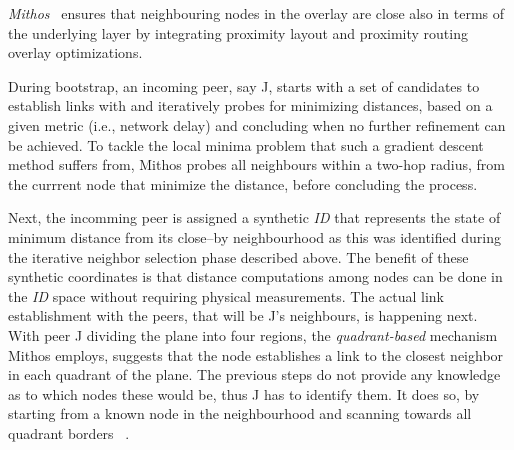 
\emph{Mithos}~\cite{WR2003} ensures that neighbouring nodes in the overlay are
close also in terms of the underlying layer by integrating proximity layout
and proximity routing overlay optimizations.

During bootstrap, an incoming peer, say J, starts with a set of
candidates to establish links with and iteratively
probes for minimizing distances, based on a given metric (i.e., network delay)
and concluding when no further refinement can be achieved. To tackle the local
minima problem that such a gradient descent method suffers from, Mithos probes
all neighbours within a two-hop radius, from the currrent node that minimize
the distance, before concluding the process.

Next, the incomming peer is assigned a synthetic \emph{ID} that
represents the state of minimum distance from its close--by neighbourhood as
this was identified during the iterative neighbor selection phase described
above. The benefit of these synthetic coordinates is that distance computations
among nodes can be done in the \emph{ID} space without requiring physical
measurements. The actual link establishment with the peers, that will be J's
neighbours, is happening next. With peer J dividing the plane into four regions,
the \emph{quadrant-based} mechanism Mithos employs, suggests that the node
establishes a link to the closest neighbor in each quadrant of the plane. The
previous steps
do not provide any knowledge as to which nodes these would be, thus J has to
identify them. It does so, by starting from a known node in the neighbourhood
and scanning towards all quadrant borders ~\cite{KK2000,R2002}. 

